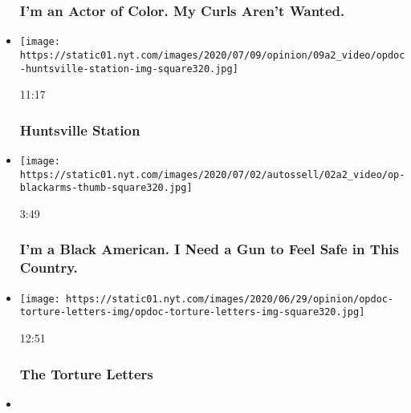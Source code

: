 \begin{itemize}
  \hypertarget{im-an-actor-of-color-my-curls-arent-wanted}{%
  \subsubsection{I'm an Actor of Color. My Curls Aren't
  Wanted.}\label{im-an-actor-of-color-my-curls-arent-wanted}}
\item
  \href{https://www.nytimes.com/video/opinion/100000007080462/huntsville-station.html?action=click\&module=video-series-bar\&region=header\&pgtype=Article\&playlistId=video/opinion}{}

  \texttt{[image: https://static01.nyt.com/images/2020/07/09/opinion/09a2\_video/opdoc-huntsville-station-img-square320.jpg]}

  11:17

  \hypertarget{huntsville-station}{%
  \subsubsection{Huntsville Station}\label{huntsville-station}}
\item
  \href{https://www.nytimes.com/video/embedded/opinion/100000007209565/black-gun-ownership.html?action=click\&module=video-series-bar\&region=header\&pgtype=Article\&playlistId=video/opinion}{}

  \texttt{[image: https://static01.nyt.com/images/2020/07/02/autossell/02a2\_video/op-blackarms-thumb-square320.jpg]}

  3:49

  \hypertarget{im-a-black-american-i-need-a-gun-to-feel-safe-in-this-country}{%
  \subsubsection{I'm a Black American. I Need a Gun to Feel Safe in This
  Country.}\label{im-a-black-american-i-need-a-gun-to-feel-safe-in-this-country}}
\item
  \href{https://www.nytimes.com/video/opinion/100000007205588/the-torture-letters.html?action=click\&module=video-series-bar\&region=header\&pgtype=Article\&playlistId=video/opinion}{}

  \texttt{[image: https://static01.nyt.com/images/2020/06/29/opinion/opdoc-torture-letters-img/opdoc-torture-letters-img-square320.jpg]}

  12:51

  \hypertarget{the-torture-letters}{%
  \subsubsection{The Torture Letters}\label{the-torture-letters}}
\item
  \href{https://www.nytimes.com/video/opinion/100000007182805/income-inequality-nba-socialism.html?action=click\&module=video-series-bar\&region=header\&pgtype=Article\&playlistId=video/opinion}{}


\end{itemize}
